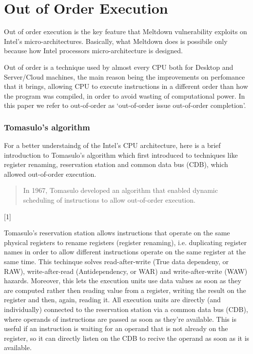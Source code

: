 \section{Out of Order Execution}
Out of order execution is the key feature that Meltdown vulnerability exploits on Intel's micro-architectures. Basically, what
Meltdown does is possibile only because how Intel processors micro-architecture is designed.

Out of order is a technique used by almost every CPU both for Desktop and Server/Cloud machines, the main reason being the improvements on perfomance that it brings, allowing
CPU to execute instructions in a different order than how the program was compiled, in order to avoid wasting of computational power.
In this paper we refer to out-of-order as `out-of-order issue out-of-order completion'.

\subsubsection{Tomasulo's algorithm}
For a better understaindg of the Intel's CPU architecture, here is a brief introduction to Tomasulo's algorithm which
first introduced to techniques like register renaming, reservation station and common data bus (CDB), which allowed
out-of-order execution.

\begin{quote}
    In 1967, Tomasulo developed an algorithm that
    enabled dynamic scheduling of instructions to allow
    out-of-order execution.
\end{quote} [1]

Tomasulo's reservation station allows instructions that operate on the same physical registers to rename registers (register renaming), i.e. duplicating
register names in order to allow different instructions operate on the same register at the same time. This techinque solves read-after-write (True data dependeny, or RAW),
write-after-read (Antidependency, or WAR) and write-after-write (WAW) hazards.
Moreover, this lets the execution units use data values as soon as they are computed rather then reading value from a register,
writing the result on the register and then, again, reading it.
All execution units are directly (and individually) connected to the reservation station via a common data bus (CDB), where operands of instructions are
passed as soon as they're available. This is useful if an instruction is waiting for an operand that is not already on the register, so it can directly listen
on the CDB to recive the operand as soon as it is available.

